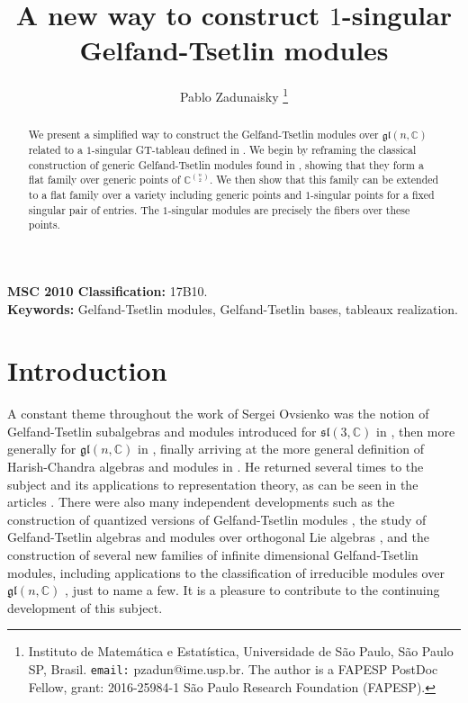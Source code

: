 \documentclass[11pt,fleqn]{article}
\title{A new way to construct $1$-singular Gelfand-Tsetlin modules}
\author{Pablo Zadunaisky
\footnote{Instituto de Matem\'atica e Estat\'istica, Universidade de S\~ao
Paulo,  S\~ao Paulo SP, Brasil. \texttt{email:} pzadun@ime.usp.br.
The author is a FAPESP PostDoc Fellow, grant: 2016-25984-1 
S\~ao Paulo Research Foundation (FAPESP).}
}
\newcommand\CC{\mathbb C}
\newcommand\gl{\mathfrak{gl}}
\begin{document}
\maketitle


\begin{abstract}
We present a simplified way to construct the Gelfand-Tsetlin modules over 
$\gl(n,\CC)$ related to a $1$-singular GT-tableau defined in 
\cite{FGR-singular-gt}. We begin by reframing the classical construction of 
generic Gelfand-Tsetlin modules found in \cite{DFO-GT-modules}, showing 
that they form a flat family over generic points of $\CC^{\binom{n}{2}}$. We
then show that this family can be extended to a flat family over a variety
including generic points and $1$-singular points for a fixed singular pair
of entries. The $1$-singular modules are precisely the fibers over these
points.
\end{abstract}

\noindent\textbf{MSC 2010 Classification:} 17B10.\\
\noindent\textbf{Keywords:} Gelfand-Tsetlin modules, Gelfand-Tsetlin bases,
tableaux realization.

\section{Introduction}
A constant theme throughout the work of Sergei Ovsienko was the notion of  
Gelfand-Tsetlin subalgebras and modules introduced for $\mathfrak{sl}(3,\CC)$ 
in \cite{DFO-gt-modules-sl3}, then more generally for $\gl(n,\CC)$ in 
\cite{DFO-GT-modules-original}, finally arriving at the more general 
definition of Harish-Chandra algebras and modules in 
\cite{DFO-GT-modules}. He returned several times to the subject and its 
applications to representation theory, as can be seen in the articles 
\cites{MO-verma-gt, Ovs-finiteness-gt, Ovs-strong-nilp, FMO-hc-for-yangians, 
FO-galois, FMO-gk-conjecture-gt, FOS-torsion, FOS-gt-categories, 
FO-fibers-gt-categories}. There were also many independent 
developments such as the construction of quantized versions of Gelfand-Tsetlin
modules \cite{MT-q-gt}, the study of Gelfand-Tsetlin algebras and modules over
orthogonal Lie algebras \cites{Maz-ort-gt, Maz-gt-ort-modules}, and the 
construction of several new families of infinite dimensional Gelfand-Tsetlin
modules, including applications to the classification of irreducible modules
over $\gl(n,\CC)$ \cites{FGR-irred-gt-sl3, FGR-irred-gt-gl, FGR-singular-gt},
just to name a few. It is a pleasure to contribute to the continuing 
development of this subject. 
\end{document}
